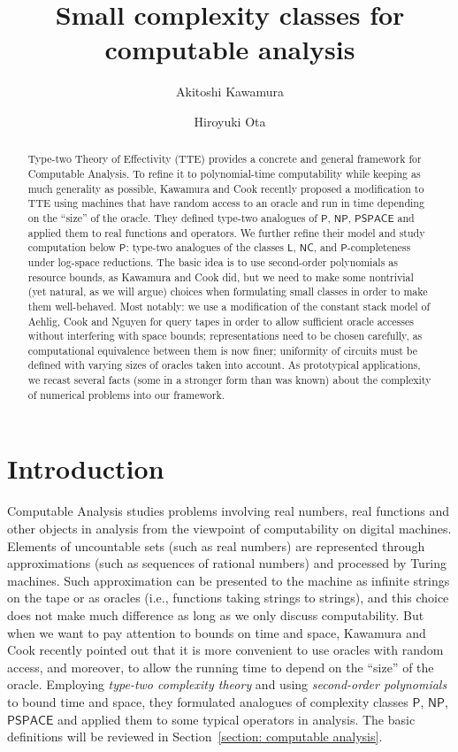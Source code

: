 \documentclass[envcountsect,envcountsame,orivec,oribibl]{llncs}
\title{Small complexity classes for computable analysis}
\author{Akitoshi Kawamura\and Hiroyuki Ota}
\newcommand{\classonefont}[1]{\mathsf{#1}}
\newcommand{\classL}{\classonefont{L}}
\newcommand{\classP}{\classonefont{P}}
\newcommand{\classPSPACE}{\classonefont{PSPACE}}
\newcommand{\classNP}{\classonefont{NP}}
\newcommand{\classNC}{\classonefont{NC}}
\begin{document}
\maketitle

\begin{abstract}
Type-two Theory of Effectivity (TTE) provides a concrete and general framework for 
Computable Analysis. 
To refine it to polynomial-time computability 
while keeping as much generality as possible, 
Kawamura and Cook recently proposed a modification to TTE using 
machines that have random access to an oracle and 
run in time depending on the ``size'' of the oracle. 
They defined type-two analogues of 
$\classP$, $\classNP$, $\classPSPACE$ 
and applied them to real functions and operators. 
We further refine their model and study computation below $\classP$: 
type-two analogues of 
the classes $\classL$, 
$\classNC$, 
and $\classP$-completeness under log-space reductions.
The basic idea is 
to use second-order polynomials as resource bounds, 
as Kawamura and Cook did, 
but we need to make some nontrivial (yet natural, as we will argue) choices
when formulating small classes
in order to make them well-behaved. 
Most notably: 
we use a modification of the constant stack model 
of Aehlig, Cook and Nguyen for query tapes 
in order to allow sufficient oracle accesses without interfering with space bounds; 
representations need to be chosen carefully, as 
computational equivalence between them is now finer; 
uniformity of circuits must be defined 
with varying sizes of oracles taken into account. 
As prototypical applications, 
we recast several facts (some in a stronger form than was known) 
about the complexity of numerical problems 
into our framework. 
\end{abstract}

\section{Introduction}
\label{section: introduction}

Computable Analysis 
\cite{bhw,ko1991complexity,weihrauch00:_comput_analy}
studies problems 
involving real numbers, real functions and other objects in analysis
from the viewpoint of computability on digital machines. 
Elements of uncountable sets (such as real numbers) are
represented through approximations (such as sequences of rational numbers)
and processed by Turing machines. 
Such approximation can be 
presented to the machine 
as infinite strings on the tape 
or as oracles (i.e., functions taking strings to strings), 
and this choice does not make much difference 
as long as we only discuss computability. 
But when we want to pay attention to bounds on time and space, 
Kawamura and Cook \cite{kawamura2012complexity} recently pointed out that 
it is more convenient to use oracles with random access, 
and moreover, to allow the running time 
to depend on the ``size'' of the oracle. 
Employing \emph{type-two complexity theory} and 
using \emph{second-order polynomials} to bound time and space, 
they formulated analogues of complexity classes 
$\classP$, $\classNP$, $\classPSPACE$ and 
applied them to some typical operators in analysis. 
The basic definitions will be reviewed in Section~\ref{section: computable analysis}. 
\end{document}
